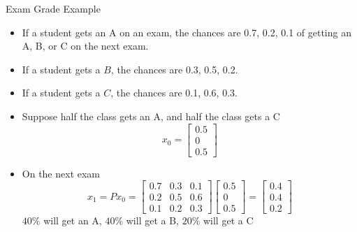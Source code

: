 \documentclass[10pt]{beamer}
\begin{document}
\begin{frame}{Exam Grade Example}

    \begin{example}
        \begin{itemize}
            \item If a student gets an A on an exam, the chances are 0.7, 0.2, 0.1 of getting an A, B, or C on the next exam.
            \item If a student gets a $B$, the chances are 0.3, 0.5, 0.2.
            \item If a student gets a $C$, the chances are 0.1, 0.6, 0.3. 
        \end{itemize}
    \end{example}
\begin{itemize}

    \item Suppose half the class gets an A, and half the class gets a C
    $$x_0 = \begin{bmatrix}
        0.5 \\0 \\ 0.5
    \end{bmatrix}$$
    \item On the next exam 
    $$x_1= Px_0=
    \begin{bmatrix}
        0.7 & 0.3 & 0.1\\
        0.2 & 0.5 & 0.6\\
        0.1 & 0.2 & 0.3
    \end{bmatrix}\begin{bmatrix}
        0.5 \\ 0 \\0.5 
    \end{bmatrix} = \begin{bmatrix}
        0.4 \\0.4\\0.2
    \end{bmatrix}
    $$
    $40\%$ will get an A, $40\%$ will get a B, $20\%$ will get a C 
\end{itemize}
\end{frame}

\end{document}
